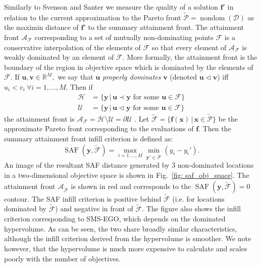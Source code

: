 \documentclass[conference]{IEEEtran}
\makeatletter
\newcommand{\attainmentfront}{\mathcal{A}}
\newcommand{\nobj}{M}
\DeclareMathOperator*{\saf}{SAF}
\DeclareMathOperator{\nondom}{nondom}
\newcommand\Papprox{\tilde{\mathcal{P}}}
\newcommand\Fapprox{\tilde{\mathcal{F}}}
\newcommand{\reals}{\mathbb{R}}
\newcommand{\given}{\,|\,}
\newcommand{\bx}{\mathbf{x}}
\newcommand{\bu}{\mathbf{u}}
\newcommand{\bv}{\mathbf{v}}
\newcommand{\by}{\mathbf{y}}
\newcommand{\bff}{\mathbf{f}}
\newcommand{\data}{\mathcal{D}}
\newcommand*{\ie}{i.e.\@\xspace}
\makeatother
\begin{document}
Similarly to Svenson and
Santer \cite{svenson2016multiobjective}  we measure the quality of a solution $\bff'$ in relation to the current approximation to the Pareto front $ \Papprox = \nondom( \data )$ as the maximin distance of $\bff'$ to the summary attainment front.  The attainment front $\attainmentfront_{\mathcal{F}}$ corresponding to a set of mutually non-dominating points $\mathcal{F}$ is a conservative interpolation of the elements of $\mathcal{F}$ so that every element of $\attainmentfront_{\mathcal{F}}$ is weakly dominated by an element of $\mathcal{F}$. More formally, the attainment front is the boundary of the region in objective space which is dominated by the elements of $\mathcal{F}$.  If
$\bu, \bv \in \reals^\nobj,$ we say that $\bu$ \textit{properly dominates} $\bv$
(denoted $\bu \lhd \bv$) iff $u_i < v_i ~\forall i = 1,\ldots, \nobj$.  Then if
\begin{align}
  \label{eq:FandU}
  \mathcal{H} &= \{\by \given \bu \prec \by \text{ for some } \bu\in \mathcal{F}\}\\
  \mathcal{U} &= \{\by \given \bu \lhd \by \text{ for some } \bu\in \mathcal{F} \}
\end{align}
the attainment front is $\attainmentfront_{\mathcal{F}} = \mathcal{H}\setminus\mathcal{U}=\partial\mathcal{U}$ \cite{smith2004dominance}.   Let $\Fapprox = \{ \bff(\bx) \given \bx \in \Papprox \}$ be the approximate Pareto front corresponding to the evaluations of $\bff$.   Then the summary attainment front infill criterion is defined as:
\begin{equation}\label{eqn: SAF}
  \saf(\by, \Fapprox) =
  \max_{i=1,\ldots, \nobj} \min_{\by' \in \Fapprox } 
  \left(
    y_i - y_i'
  \right).
\end{equation}
An image of the resultant SAF  distance generated by 3 non-dominated locations  in a two-dimensional  objective space  is shown in Fig.~\ref{fig: saf_obj_space}.   The attainment front $\attainmentfront_{\Fapprox}$ is shown in red and corresponds to the $\saf(\by, \Fapprox) = 0$ contour. The SAF infill criterion is positive behind $ \Fapprox$ (\ie for locations dominated by $\Fapprox$) and negative in front of $\Fapprox$. The figure also shows the infill criterion corresponding to SMS-EGO, which depends on the dominated hypervolume.    As can be seen, the two share broadly similar characteristics, although the infill criterion derived from the hypervolume is smoother.  We note however, that the hypervolume is much more expensive to calculate and scales poorly with the number of objectives. 
 
\end{document}
